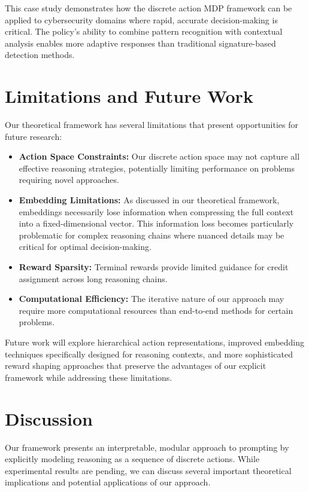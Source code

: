 \documentclass[10pt,journal,compsoc]{IEEEtran}
\begin{document}
This case study demonstrates how the discrete action MDP framework can be applied to cybersecurity domains where rapid, accurate decision-making is critical. The policy's ability to combine pattern recognition with contextual analysis enables more adaptive responses than traditional signature-based detection methods.

\section{Limitations and Future Work}

Our theoretical framework has several limitations that present opportunities for future research:

\begin{itemize}
\item \textbf{Action Space Constraints:} Our discrete action space may not capture all effective reasoning strategies, potentially limiting performance on problems requiring novel approaches.

\item \textbf{Embedding Limitations:} As discussed in our theoretical framework, embeddings necessarily lose information when compressing the full context into a fixed-dimensional vector. This information loss becomes particularly problematic for complex reasoning chains where nuanced details may be critical for optimal decision-making.

\item \textbf{Reward Sparsity:} Terminal rewards provide limited guidance for credit assignment across long reasoning chains.

\item \textbf{Computational Efficiency:} The iterative nature of our approach may require more computational resources than end-to-end methods for certain problems.
\end{itemize}

Future work will explore hierarchical action representations, improved embedding techniques specifically designed for reasoning contexts, and more sophisticated reward shaping approaches that preserve the advantages of our explicit framework while addressing these limitations.

\section{Discussion}

Our framework presents an interpretable, modular approach to prompting by explicitly modeling reasoning as a sequence of discrete actions. While experimental results are pending, we can discuss several important theoretical implications and potential applications of our approach.
\end{document}
